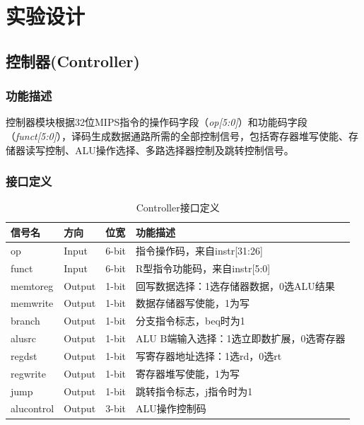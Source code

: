 \section{实验设计}

\subsection{控制器(Controller)}\label{sub:controller}

\subsubsection{功能描述}
控制器模块根据32位MIPS指令的操作码字段（\textit{op[5:0]}）和功能码字段（\textit{funct[5:0]}），译码生成数据通路所需的全部控制信号，包括寄存器堆写使能、存储器读写控制、ALU操作选择、多路选择器控制及跳转控制信号。

\subsubsection{接口定义}

\begin{table}[htp]
\caption{Controller接口定义}\label{tab:ctrl_signal}
\begin{center}
    \begin{tabular}{|l|l|l|p{6cm}|}
    \hline
    \textbf{信号名} & \textbf{方向} & \textbf{位宽} & \textbf{功能描述}\\ \hline \hline
    op          & Input  & 6-bit & 指令操作码，来自instr[31:26] \\ \hline
    funct       & Input  & 6-bit & R型指令功能码，来自instr[5:0] \\ \hline
    memtoreg    & Output & 1-bit & 回写数据选择：1选存储器数据，0选ALU结果 \\ \hline
    memwrite    & Output & 1-bit & 数据存储器写使能，1为写 \\ \hline
    branch      & Output & 1-bit & 分支指令标志，beq时为1 \\ \hline
    alusrc      & Output & 1-bit & ALU B端输入选择：1选立即数扩展，0选寄存器 \\ \hline
    regdst      & Output & 1-bit & 写寄存器地址选择：1选rd，0选rt \\ \hline
    regwrite    & Output & 1-bit & 寄存器堆写使能，1为写 \\ \hline
    jump        & Output & 1-bit & 跳转指令标志，j指令时为1 \\ \hline
    alucontrol  & Output & 3-bit & ALU操作控制码 \\ \hline
    \end{tabular}
\end{center}
\end{table}

